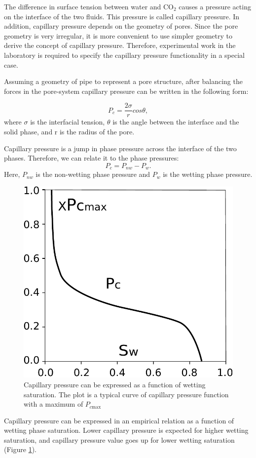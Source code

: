 The difference in surface tension between water and $\mbox{CO}_2$ causes a
pressure acting on the interface of the two fluids. This pressure is called
capillary pressure. In addition, capillary pressure depends on the geometry of
pores. Since the pore geometry is very irregular, it is more convenient to use
simpler geometry to derive the concept of capillary pressure. Therefore,
experimental work in the laboratory is required to specify the capillary
pressure functionality in a special case. 

Assuming a geometry of pipe to represent a pore structure, after balancing the
forces in the pore-system capillary pressure can be written in the following
form:

\begin{equation}
 P_c=\frac{2\sigma}{r}cos\theta,
 \label{eq:pcS}
\end{equation} where $\sigma$ is the interfacial tension, $\theta$ is the angle
between the interface and the solid phase, and r is the radius of the pore.

Capillary pressure is a jump in phase pressure across the interface of the two
phases. Therefore, we can relate it to the phase pressures:
\begin{equation}
 P_c=P_{nw}-P_w.
 \label{eq:pcJump}
\end{equation} Here, $P_{nw}$ is the non-wetting phase pressure and $P_w$ is the
wetting phase pressure. 


\begin{figure} 
  \centering{}
  \includegraphics[width= 0.45 \linewidth]{./figurer/Pc}
  \caption{Capillary pressure can be expressed as a function of wetting
saturation. The plot is a typical curve of capillary pressure function with a
maximum of $P_{c\mbox{max}}$}
  \label{fig:pc}
\end{figure}

Capillary pressure can be expressed in an empirical relation as a function of
wetting phase saturation. Lower capillary pressure is expected for higher
wetting saturation, and capillary pressure value goes up for lower wetting
saturation (Figure \ref{fig:pc}). 

